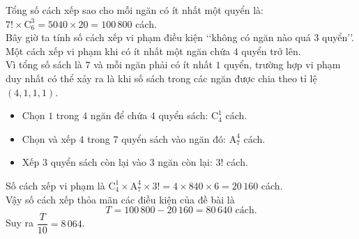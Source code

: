 \begin{ex}
{\begin{itemize}
		\end{itemize}
		Tổng số cách xếp sao cho mỗi ngăn có ít nhất một quyển là: $7! \times \mathrm{C}_6^3 = 5040 \times 20 = 100\,800$ cách.\\
		Bây giờ ta tính số cách xếp vi phạm điều kiện \lq\lq không có ngăn nào quá 3 quyển\rq\rq.\\
		Một cách xếp vi phạm khi có ít nhất một ngăn chứa $4$ quyển trở lên.\\ Vì tổng số sách là $7$ và mỗi ngăn phải có ít nhất $1$ quyển, trường hợp vi phạm duy nhất có thể xảy ra là khi số sách trong các ngăn được chia theo tỉ lệ $(4, 1, 1, 1)$.
		\begin{itemize}
			\item Chọn $1$ trong $4$ ngăn để chứa $4$ quyển sách: $\mathrm{C}_4^1$ cách.
			\item Chọn và xếp $4$ trong $7$ quyển sách vào ngăn đó: $\mathrm{A}_7^4$ cách.
			\item Xếp $3$ quyển sách còn lại vào $3$ ngăn còn lại: $3!$ cách.
		\end{itemize}
		Số cách xếp vi phạm là $\mathrm{C}_4^1 \times \mathrm{A}_7^4 \times 3! = 4 \times 840 \times 6 = 20\,160$ cách.\\
		Vậy số cách xếp thỏa mãn các điều kiện của đề bài là
		$$T=100\,800 - 20\,160 = 80\,640 \text{ cách.}$$
		Suy ra $\dfrac{T}{10}=8\,064$. 
	}
\end{ex} 
